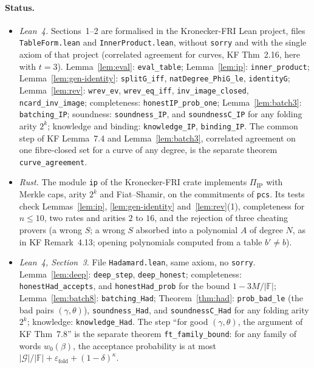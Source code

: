 \documentclass[11pt]{article}
\theoremstyle{definition}
\newcommand{\F}{\mathbb{F}}
\begin{document}
\paragraph{Status.}
\begin{itemize}[nosep]
\item \emph{Lean~4.} Sections~1--2 are formalised in the Kronecker-FRI Lean project, files \texttt{TableForm.lean} and \texttt{InnerProduct.lean}, without \texttt{sorry} and with the single axiom of that project (correlated agreement for curves, KF Thm~2.16, here with $t=3$).
Lemma~\ref{lem:eval}: \texttt{eval\_table}; Lemma~\ref{lem:ip}: \texttt{inner\_product}; Lemma~\ref{lem:gen-identity}: \texttt{splitG\_iff}, \texttt{natDegree\_PhiG\_le}, \texttt{identityG}; Lemma~\ref{lem:rev}: \texttt{wrev\_ev}, \texttt{wrev\_eq\_iff}, \texttt{inv\_image\_closed}, \texttt{ncard\_inv\_image}; completeness: \texttt{honestIP\_prob\_one}; Lemma~\ref{lem:batch3}: \texttt{batching\_IP}; soundness: \texttt{soundness\_IP}, and \texttt{soundnessC\_IP} for any folding arity $2^k$; knowledge and binding: \texttt{knowledge\_IP}, \texttt{binding\_IP}.
The common step of KF Lemma~7.4 and Lemma~\ref{lem:batch3}, correlated agreement on one fibre-closed set for a curve of any degree, is the separate theorem \texttt{curve\_agreement}.
\item \emph{Rust.} The module \texttt{ip} of the Kronecker-FRI crate implements $\Pi_{\mathrm{IP}}$ with Merkle caps, arity $2^k$ and Fiat--Shamir, on the commitments of \texttt{pcs}. Its tests check Lemmas~\ref{lem:ip}, \ref{lem:gen-identity} and~\ref{lem:rev}(1), completeness for $n\le10$, two rates and arities $2$ to $16$, and the rejection of three cheating provers (a wrong $S$; a wrong $S$ absorbed into a polynomial $A$ of degree $N$, as in KF Remark~4.13; opening polynomials computed from a table $b'\ne b$).
\item \emph{Lean~4, Section~3.} File \texttt{Hadamard.lean}, same axiom, no \texttt{sorry}. Lemma~\ref{lem:deep}: \texttt{deep\_step}, \texttt{deep\_honest}; completeness: \texttt{honestHad\_accepts}, and \texttt{honestHad\_prob} for the bound $1-3M/|\F|$; Lemma~\ref{lem:batch8}: \texttt{batching\_Had}; Theorem~\ref{thm:had}: \texttt{prob\_bad\_le} (the bad pairs $(\gamma,\theta)$), \texttt{soundness\_Had}, and \texttt{soundnessC\_Had} for any folding arity $2^k$; knowledge: \texttt{knowledge\_Had}. The step ``for good $(\gamma,\theta)$, the argument of KF Thm~7.8'' is the separate theorem \texttt{ft\_family\_bound}: for any family of words $w_0(\beta)$, the acceptance probability is at most $|\mathcal G|/|\F|+\varepsilon_{\mathrm{fold}}+(1-\delta)^\kappa$.

\end{itemize}
\end{document}
